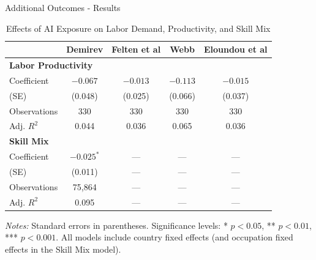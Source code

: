 \documentclass{beamer}
\begin{document}
\begin{frame}{Additional Outcomes - Results}
    \begin{table}[H]
        \centering
        \begin{threeparttable}
        \caption{Effects of AI Exposure on Labor Demand, Productivity, and Skill Mix}
        \begin{tabular}{lcccc}
            \toprule
            & \textbf{Demirev} & \textbf{Felten et al} & \textbf{Webb} & \textbf{Eloundou et al} \\
            \midrule
            \multicolumn{5}{l}{\textbf{Labor Productivity}} \\
            Coefficient   & $-0.067$       & $-0.013$       & $-0.113$      & $-0.015$     \\
            (SE)          & (0.048)        & (0.025)        & (0.066)       & (0.037)      \\
            Observations  & 330            & 330            & 330           & 330          \\
            Adj. $R^2$    & 0.044          & 0.036          & 0.065         & 0.036        \\
            \midrule
            \multicolumn{5}{l}{\textbf{Skill Mix}} \\
            Coefficient   & $-0.025^{*}$   & ---            & ---           & ---          \\
            (SE)          & (0.011)        & ---            & ---           & ---          \\
            Observations  & 75,864         & ---            & ---           & ---          \\
            Adj. $R^2$    & 0.095          & ---            & ---           & ---          \\
            \bottomrule
        \end{tabular}
        \begin{tablenotes}
            \footnotesize
            \item \textit{Notes:} Standard errors in parentheses. Significance levels: * $p<0.05$, ** $p<0.01$, *** $p<0.001$. All models include country fixed effects (and occupation fixed effects in the Skill Mix model).
        \end{tablenotes}
        \label{table:models}
        \end{threeparttable}
    \end{table}
\end{frame}
\end{document}
